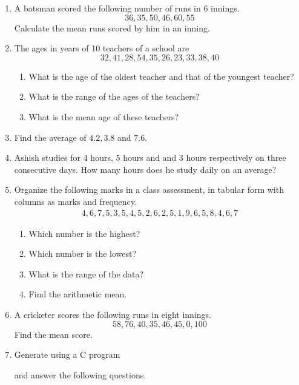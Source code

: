 \begin{enumerate}[label=\thesection.\arabic*, ref=\thesection.\theenumi]
\item A batsman scored the following number of runs in 6 innings.  
	$$36, 35, 50, 46, 60, 55$$
	Calculate the mean runs scored by him in an inning.
	\\
	\solution
	
\item The ages in years of 10 teachers of a school are
	$$32, 41, 28, 54, 35, 26, 23, 33, 38, 40$$
	\begin{enumerate}
		\item What is the age of the oldest teacher and that of the youngest teacher?
			\\
			\solution
	
		\item What is the range of the ages of the teachers?
		\item What is the mean age of these teachers?
	\end{enumerate}
\item Find the average of $4.2, 3.8$ and $7.6$.
\item Ashish studies for 4 hours, 5 hours and and 3 hours respectively on three consecutive days.  How many hours does he study daily on an average?
\item Organize the following marks in a class assessment, in tabular form with columns as marks and frequency.
	\begin{gather}
	4, 6, 7, 5, 3, 5, 4, 5, 2, 6, 2, 5, 1, 9, 6, 5, 8, 4, 6, 7
	\end{gather}
	\begin{enumerate}
		\item Which number is the highest?
		\item Which number is the lowest?
		\item What is the range of the data?
		\item Find the arithmetic mean.
	\end{enumerate}
	
	\solution
\item A cricketer scores the following runs in eight innings.
	$$58, 76, 40, 35, 46, 45, 0, 100$$
	Find the mean score.
\item Generate 
using a C program
	\begin{table}[H]
  \centering
  
  \caption{}
  \label{tab:player}
\end{table}
and answer the following questions.
\begin{enumerate}

\end{enumerate}
\end{enumerate}
